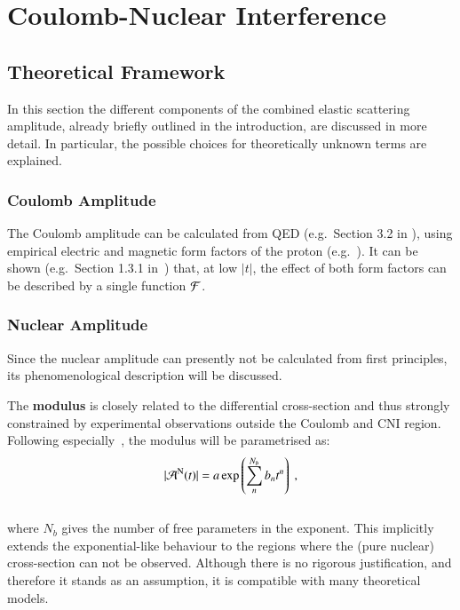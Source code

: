 \section{Coulomb-Nuclear Interference}


\subsection{Theoretical Framework}
\label{sec:cni_framework}
In this section the different components of the combined elastic scattering amplitude, already briefly outlined in the introduction, are discussed in more detail. In particular, the possible choices for theoretically unknown terms are explained.

\subsubsection{Coulomb Amplitude}
%
The Coulomb amplitude can be calculated from QED (e.g.~Section 3.2 in \cite{block06}), using empirical electric and magnetic form factors of the proton (e.g.~\cite{puckett10}). It can be shown (e.g.~Section 1.3.1 in~\cite{jan_thesis}) that, at low $|t|$, the effect of both form factors can be described by a single function ${\cal F}$. 


\subsubsection{Nuclear Amplitude}
%
Since the nuclear amplitude can presently not be calculated from first principles, its phenomenological description will be discussed.

The {\bf modulus} is closely related to the differential cross-section and thus strongly constrained by experimental observations outside the Coulomb and CNI region. Following especially~\cite{8tev-90m}, the modulus will be parametrised as:
\begin{equation}
\label{eq:nuc mod}
| {\cal A}^{\rm N}(t) | = a \exp\left( \sum\limits_{n}^{N_b} b_n t^n \right)\ ,
\end{equation}
\\
where $N_b$ gives the number of free parameters in the exponent. This implicitly extends the exponential-like behaviour to the regions where the (pure nuclear) cross-section can not be observed. Although there is no rigorous justification, and therefore it stands as an assumption, it is compatible with many theoretical models.

